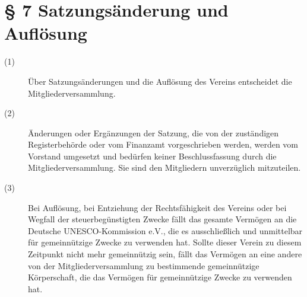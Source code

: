 \documentclass[a4paper,12pt]{scrartcl}
\begin{document}
\section*{\S{} 7 Satzungsänderung und Auflösung}
\begin{description} 

\item[(1)] Über Satzungsänderungen und die Auflösung des Vereins entscheidet die Mitgliederversammlung.
\item[(2)] Änderungen oder Ergänzungen der Satzung, die von der zuständigen Registerbehörde oder vom Finanzamt vorgeschrieben werden, werden vom Vorstand umgesetzt und bedürfen keiner Beschlussfassung durch die Mitgliederversammlung. Sie sind den Mitgliedern unverzüglich mitzuteilen.
\item[(3)] Bei Auflösung, bei Entziehung der Rechtsfähigkeit des Vereins oder bei Wegfall der steuerbegünstigten Zwecke fällt das gesamte Vermögen an die Deutsche UNESCO-Kommission e.V., die es ausschließlich und unmittelbar für gemeinnützige Zwecke zu verwenden hat. Sollte dieser Verein zu diesem Zeitpunkt nicht mehr gemeinnützig sein, fällt das Vermögen an eine andere von der Mitgliederversammlung zu bestimmende gemeinnützige Körperschaft, die das Vermögen für gemeinnützige Zwecke zu verwenden hat.

\end{description}
\end{document}
